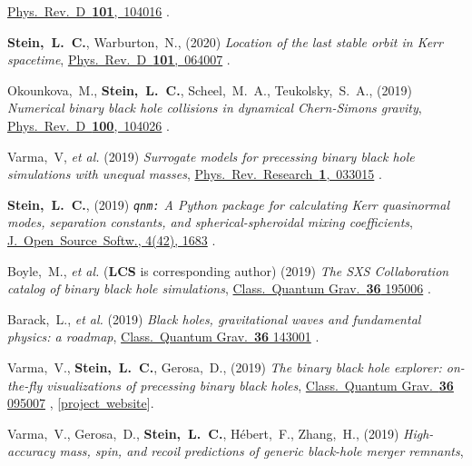 \begin{etaremune}[start=\value{pubCounter}]
  \href{https://doi.org/10.1103/PhysRevD.101.104016}{Phys.~Rev.~D~{\bf 101},~104016}
  .
\item
  {\bf Stein,~L.~C.},
  Warburton,~N.,
  (2020)
  {\it Location of the last stable orbit in Kerr spacetime},
  \href{https://doi.org/10.1103/PhysRevD.101.064007}{Phys.~Rev.~D~{\bf 101},~064007}
  .
\item
  Okounkova,~M.,
  {\bf Stein,~L.~C.},
  Scheel,~M.~A.,
  Teukolsky,~S.~A.,
  (2019)
  {\it Numerical binary black hole collisions in dynamical Chern-Simons gravity},
  \href{https://doi.org/10.1103/PhysRevD.100.104026}{Phys.~Rev.~D~{\bf 100},~104026}
  .
\item
  Varma,~V, {\it et al.}
  (2019)
  {\it Surrogate models for precessing binary black hole simulations with
  unequal masses},
  \href{https://doi.org/10.1103/PhysRevResearch.1.033015}{Phys.~Rev.~Research~{\bf 1},~033015}
  .
\item
  {\bf Stein,~L.~C.},
  (2019)
  \hspace{0.1em}
  {\it {\tt qnm:} A Python package for calculating Kerr quasinormal modes, separation constants, and spherical-spheroidal mixing coefficients},
  \href{https://doi.org/10.21105/joss.01683}{J.~Open~Source~Softw., 4(42), 1683}
  .
\item
  Boyle,~M., {\it et al.} ({\bf LCS} is corresponding author)
  (2019)
  {\it The SXS Collaboration catalog of binary black hole simulations},
  \href{https://doi.org/10.1088/1361-6382/ab34e2}{Class.~Quantum Grav.~{\bf 36} 195006}
  .
\item
  Barack,~L., {\it et al.}
  (2019)
  {\it Black holes, gravitational waves and fundamental physics: a roadmap},
  \href{https://doi.org/10.1088/1361-6382/ab0587}{Class.~Quantum Grav.~{\bf 36} 143001}
  .
\item
  Varma,~V., {\bf Stein,~L.~C.}, Gerosa,~D.,
  (2019)
  {\it The binary black hole explorer: on-the-fly visualizations of precessing binary black holes},
  \href{https://doi.org/10.1088/1361-6382/ab0ee9}{Class.~Quantum Grav.~{\bf 36} 095007}
  ,
  [\href{https://vijayvarma392.github.io/binaryBHexp/}{project~website}].
\item
  Varma,~V., Gerosa,~D., {\bf Stein,~L.~C.}, H\'ebert,~F.,  Zhang,~H.,
  (2019)
  {\it High-accuracy mass, spin, and recoil predictions of generic black-hole merger remnants},

\end{etaremune}

